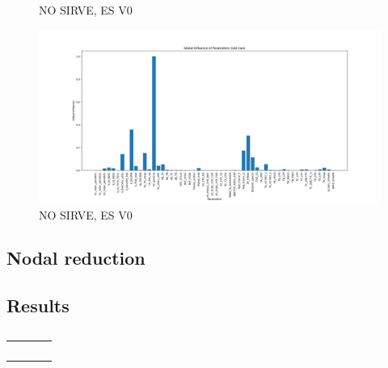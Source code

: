 \begin{itemize}
\begin{figure}[H]
	\caption{NO SIRVE, ES V0}
	\label{fig:fm3}
\end{figure}
\begin{figure}[H]
	\centering
	\includegraphics[width=\textwidth]{Figures/figs_malas/infGlobalCold.png}
	\caption{NO SIRVE, ES V0}
	\label{fig:fm4}
\end{figure}
\subsection{Nodal reduction}
\subsection{Results}


\begin{table}[H]
\centering
\caption{}
\begin{tabular}{c c}
\toprule
{} & \ \ \midrule
	&    \ \ \bottomrule
\end{tabular}
\end{table}







\end{itemize}
